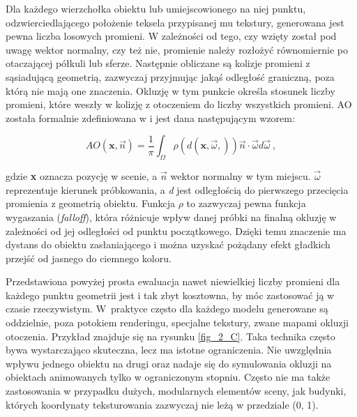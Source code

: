 	
	Dla każdego wierzchołka obiektu lub umiejscowionego na niej punktu, odzwierciedlającego położenie teksela przypisanej mu tekstury, generowana jest pewna liczba losowych promieni. W zależności od tego, czy wzięty został pod uwagę wektor normalny, czy też nie, promienie należy rozłożyć równomiernie po otaczającej półkuli lub sferze. Następnie obliczane są kolizje promieni z sąsiadującą geometrią, zazwyczaj przyjmując jakąś odległość graniczną, poza którą nie mają one znaczenia. Okluzję w tym punkcie określa stosunek liczby promieni, które weszły w kolizję z otoczeniem do liczby wszystkich promieni. AO została formalnie zdefiniowana w \cite{sloan} i jest dana następującym wzorem:
	
	\begin{equation}
	\mathit{AO}(\mathbf{x}, \vec{n}) = \frac{1}{\pi}\int_{\Omega}^{}\rho(\mathit{d}(\mathbf{x}, \vec{\omega},))\vec{n}\cdot \vec{\omega}d\vec{\omega}\ ,
	\end{equation}
	
	gdzie \textbf{x} oznacza pozycję w scenie, a \(\vec{n}\) wektor normalny w tym miejscu. \(\vec{\omega}\) reprezentuje kierunek próbkowania, a \textit{d} jest odległością do pierwszego przecięcia promienia z geometrią obiektu. Funkcja \(\rho\) to zazwyczaj pewna funkcja wygaszania (\textit{falloff}), która różnicuje wpływ danej próbki na finalną okluzję w zależności od jej odległości od punktu początkowego. Dzięki temu znaczenie ma dystans do obiektu zasłaniającego i można uzyskać pożądany efekt gładkich przejść od jasnego do ciemnego koloru.
	
	Przedstawiona powyżej prosta ewaluacja nawet niewielkiej liczby promieni dla każdego punktu geometrii jest i tak zbyt kosztowna, by móc zastosować ją w czasie rzeczywistym. W~praktyce często dla każdego modelu generowane są oddzielnie, poza potokiem renderingu, specjalne tekstury, zwane mapami okluzji otoczenia. Przykład znajduje się na rysunku \ref{fig_2_C}. Taka technika często bywa wystarczająco skuteczna, lecz ma istotne ograniczenia. Nie uwzględnia wpływu jednego obiektu na drugi oraz nadaje się do symulowania okluzji na obiektach animowanych tylko w ograniczonym stopniu. Często nie ma także zastosowania w przypadku dużych, modularnych elementów sceny, jak budynki, których koordynaty teksturowania zazwyczaj nie leżą w przedziale (0, 1).
	
	
